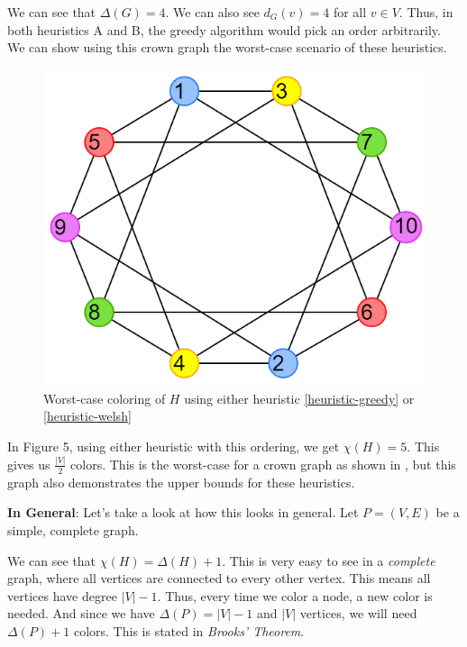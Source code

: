 \documentclass{article}
\newcounter{heuristic} \setcounter{heuristic}{0}
\theoremstyle{definition}
\begin{document}
We can see that \(\Delta(G) = 4\). We can also see \(d_G(v) = 4\) for all \(v \in V\). Thus, in both heuristics A and B, the greedy algorithm would pick an order arbitrarily. We can show using this crown graph the worst-case scenario of these heuristics.

\begin{figure}[H]
\centering
\includegraphics[scale=0.38]{images/graph-5.png}
\caption{Worst-case coloring of \(H\) using either heuristic \ref{heuristic-greedy} or \ref{heuristic-welsh}}
\end{figure}

In Figure 5, using either heuristic with this ordering, we get \(\chi(H) = 5\). This gives us \(\frac{|V|}{2}\) colors. This is the worst-case for a crown graph as shown in \cite{johnson}, but this graph also demonstrates the upper bounds for these heuristics. \newline

\textbf{In General}: Let's take a look at how this looks in general. Let \(P = (V, E)\) be a simple, complete graph. \newline

We can see that \(\chi(H) = \Delta(H) + 1\). This is very easy to see in a \emph{complete} graph, where all vertices are connected to every other vertex. This means all vertices have degree \(|V| - 1\). Thus, every time we color a node, a new color is needed. And since we have \(\Delta(P) = |V| - 1\) and \(|V|\) vertices, we will need \(\Delta(P) + 1\) colors. This is stated in \emph{Brooks' Theorem}.
\end{document}
